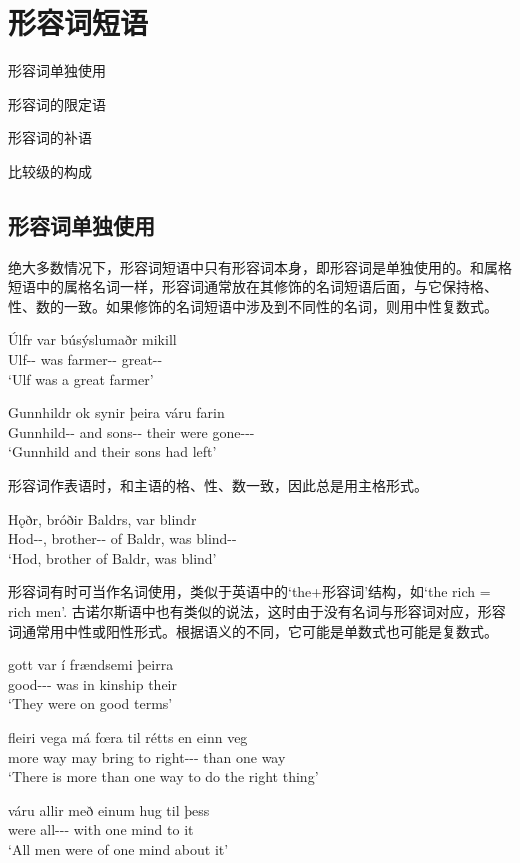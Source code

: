 \chapter{形容词短语}
\begin{introduction}
    \item 形容词单独使用
    \item 形容词的限定语
    \item 形容词的补语
    \item 比较级的构成
\end{introduction}

\section{形容词单独使用}
绝大多数情况下，形容词短语中只有形容词本身，即形容词是单独使用的。和属格短语中的属格名词一样，形容词通常放在其修饰的名词短语后面，与它保持格、性、数的一致。如果修饰的名词短语中涉及到不同性的名词，则用中性复数式。
\begin{exe}
    \ex \gll
    Úlfr var búsýslumaðr mikill\\
    Ulf-{\nom}-{\mas} was farmer-{\nom}-{\mas} great-{\nom}-{\mas}\\
    \trans `Ulf was a great farmer'

    \ex \gll
    Gunnhildr ok synir þeira váru farin\\
    Gunnhild-{\nom}-{\fem} and sons-{\nom}-{\mas} their were gone-{\nom}-{\neu}-{\pl}\\
    `Gunnhild and their sons had left'
\end{exe}

形容词作表语时，和主语的格、性、数一致，因此总是用主格形式。
\begin{exe}
    \ex \gll
    Hǫðr, bróðir Baldrs, var blindr\\
    Hod-{\nom}-{\mas}, brother-{\nom}-{\mas} of Baldr, was blind-{\nom}-{\mas}\\
    \trans `Hod, brother of Baldr, was blind'
\end{exe}


形容词有时可当作名词使用，类似于英语中的`the+形容词'结构，如`the rich = rich men'. 古诺尔斯语中也有类似的说法，这时由于没有名词与形容词对应，形容词通常用中性或阳性形式。根据语义的不同，它可能是单数式也可能是复数式。

\begin{exe}
    \ex \gll
    gott var í frændsemi þeirra\\
    good-{\nom}-{\mas}-{\sing} was in kinship their\\
    \trans `They were on good terms'

    \ex \gll
    fleiri vega má fœra til rétts en einn veg\\
    more way may bring to right-{\gen}-{\neu}-{\sing} than one way\\
    \trans `There is more than one way to do the right thing'

    \ex \gll
    váru allir með einum hug til þess\\
    were all-{\nom}-{\mas}-{\pl} with one mind to it\\
    \trans `All men were of one mind about it'
\end{exe}

